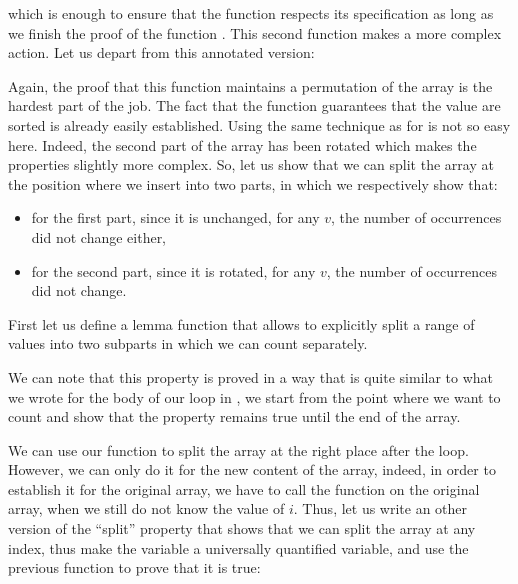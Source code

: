 

which is enough to ensure that the  function
respects its specification as long as we finish the proof of the function
. This second function makes a more complex action. Let us
depart from this annotated version:




Again, the proof that this function maintains a permutation of the array is
the hardest part of the job. The fact that the function guarantees that the
value are sorted is already easily established. Using the same technique as
for  is not so easy here. Indeed, the second part
of the array has been rotated which makes the properties slightly more
complex. So, let us show that we can split the array at the position where
we insert into two parts, in which we respectively show that:

\begin{itemize}
\item for the first part, since it is unchanged, for any $v$, the number of
  occurrences did not change either,
\item for the second part, since it is rotated, for any $v$, the number of
  occurrences did not change.
\end{itemize}

First let us define a lemma function that allows to explicitly split a range of
values into two subparts in which we can count separately.




We can note that this property is proved in a way that is quite similar to what
we wrote for the body of our loop in , we start from
the point where we want to count and show that the property remains true until
the end of the array. 



We can use our function to split the array at the right place after the loop.
However, we can only do it for the new content of the array, indeed, in order to
establish it for the original array, we have to call the function on the
original array, when we still do not know the value of $i$. Thus, let us write
an other version of the ``split'' property that shows that we can split the
array at any index, thus make the  variable a universally
quantified variable, and use the previous function to prove that it is true:


